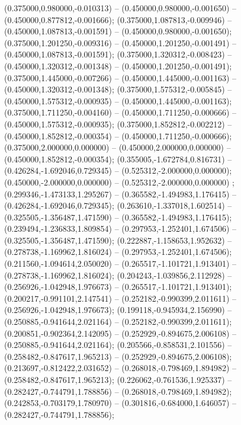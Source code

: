  (0.375000,0.980000,-0.010313) -- (0.450000,0.980000,-0.001650) -- (0.450000,0.877812,-0.001666);
 (0.375000,1.087813,-0.009946) -- (0.450000,1.087813,-0.001591) -- (0.450000,0.980000,-0.001650);
 (0.375000,1.201250,-0.009316) -- (0.450000,1.201250,-0.001491) -- (0.450000,1.087813,-0.001591);
 (0.375000,1.320312,-0.008423) -- (0.450000,1.320312,-0.001348) -- (0.450000,1.201250,-0.001491);
 (0.375000,1.445000,-0.007266) -- (0.450000,1.445000,-0.001163) -- (0.450000,1.320312,-0.001348);
 (0.375000,1.575312,-0.005845) -- (0.450000,1.575312,-0.000935) -- (0.450000,1.445000,-0.001163);
 (0.375000,1.711250,-0.004160) -- (0.450000,1.711250,-0.000666) -- (0.450000,1.575312,-0.000935);
 (0.375000,1.852812,-0.002212) -- (0.450000,1.852812,-0.000354) -- (0.450000,1.711250,-0.000666);
 (0.375000,2.000000,0.000000) -- (0.450000,2.000000,0.000000) -- (0.450000,1.852812,-0.000354);
 (0.355005,-1.672784,0.816731) -- (0.426284,-1.692046,0.729345) -- (0.525312,-2.000000,0.000000);
 (0.450000,-2.000000,0.000000) -- (0.525312,-2.000000,0.000000) ;
 (0.299346,-1.473133,1.295267) -- (0.365582,-1.494983,1.176415) -- (0.426284,-1.692046,0.729345);
 (0.263610,-1.337018,1.602514) -- (0.325505,-1.356487,1.471590) -- (0.365582,-1.494983,1.176415);
 (0.239494,-1.236833,1.809854) -- (0.297953,-1.252401,1.674506) -- (0.325505,-1.356487,1.471590);
 (0.222887,-1.158653,1.952632) -- (0.278738,-1.169962,1.816024) -- (0.297953,-1.252401,1.674506);
 (0.211560,-1.094614,2.050020) -- (0.265517,-1.101721,1.913401) -- (0.278738,-1.169962,1.816024);
 (0.204243,-1.039856,2.112928) -- (0.256926,-1.042948,1.976673) -- (0.265517,-1.101721,1.913401);
 (0.200217,-0.991101,2.147541) -- (0.252182,-0.990399,2.011611) -- (0.256926,-1.042948,1.976673);
 (0.199118,-0.945934,2.156990) -- (0.250885,-0.941644,2.021164) -- (0.252182,-0.990399,2.011611);
 (0.200851,-0.902364,2.142095) -- (0.252929,-0.894675,2.006108) -- (0.250885,-0.941644,2.021164);
 (0.205566,-0.858531,2.101556) -- (0.258482,-0.847617,1.965213) -- (0.252929,-0.894675,2.006108);
 (0.213697,-0.812422,2.031652) -- (0.268018,-0.798469,1.894982) -- (0.258482,-0.847617,1.965213);
 (0.226062,-0.761536,1.925337) -- (0.282427,-0.744791,1.788856) -- (0.268018,-0.798469,1.894982);
 (0.242853,-0.703179,1.780970) -- (0.301816,-0.684000,1.646057) -- (0.282427,-0.744791,1.788856);
